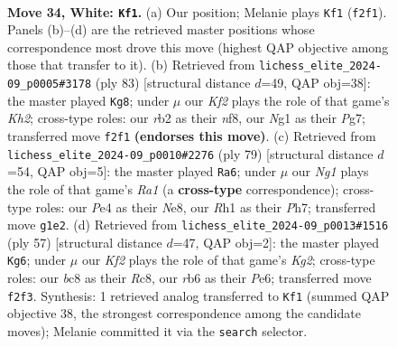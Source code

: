 \documentclass[11pt]{article}
\begin{document}
\begin{figure}[p]
\label{fig:thought-m64}
\end{figure}

\clearpage

\begin{figure}[p]\centering
\begin{subfigure}{0.46\textwidth}\centering
\resizebox{\linewidth}{!}{%
\newchessgame
\chessboard[
  setfen={2b4k/3n1p1p/1r4p1/3PP3/1p2P3/6P1/1r3K1P/R5NR w - - 1 34},
  showmover=false,
  pgfstyle=straightmove, color=movearrow, markmove={f2-f1}
]}
\caption{}
\end{subfigure}\hfill
\begin{subfigure}{0.46\textwidth}\centering
\resizebox{\linewidth}{!}{%
\newchessgame
\chessboard[
  setfen={5N2/6pk/p1n1Pp1p/8/3pR1PK/1r5P/2r5/4R3 b - - 3 42},
  showmover=false,
  pgfstyle=straightmove, color=movearrow, markmove={h7-g8}
]}
\caption{}
\end{subfigure}
\\[4pt]
\begin{subfigure}{0.46\textwidth}\centering
\resizebox{\linewidth}{!}{%
\newchessgame
\chessboard[
  setfen={r3nk2/5p1p/2Pp2p1/2p5/P1N3P1/1P2R2P/5P2/6K1 b - - 0 40},
  showmover=false,
  pgfstyle=straightmove, color=movearrow, markmove={a8-a6}
]}
\caption{}
\end{subfigure}\hfill
\begin{subfigure}{0.46\textwidth}\centering
\resizebox{\linewidth}{!}{%
\newchessgame
\chessboard[
  setfen={2r5/3p1pk1/3Ppn2/p1r3p1/8/P1N1R2P/1P4P1/3R2K1 b - - 3 29},
  showmover=false,
  pgfstyle=straightmove, color=movearrow, markmove={g7-g6}
]}
\caption{}
\end{subfigure}
\caption{\textbf{Move 34, White: \texttt{Kf1}.} (a) Our position; Melanie plays \texttt{Kf1} (\texttt{f2f1}). Panels (b)--(d) are the retrieved master positions whose correspondence most drove this move (highest QAP objective among those that transfer to it). (b) Retrieved from \texttt{lichess\_elite\_2024-09\_p0005\#3178} (ply 83) [structural distance $d$=49, QAP obj=38]: the master played \texttt{Kg8}; under $\mu$ our \emph{Kf2} plays the role of that game's \emph{Kh2}; cross-type roles: our \emph{r}b2 as their \emph{n}f8, our \emph{N}g1 as their \emph{P}g7; transferred move \texttt{f2f1} \textbf{(endorses this move)}. (c) Retrieved from \texttt{lichess\_elite\_2024-09\_p0010\#2276} (ply 79) [structural distance $d$=54, QAP obj=5]: the master played \texttt{Ra6}; under $\mu$ our \emph{Ng1} plays the role of that game's \emph{Ra1} (a \textbf{cross-type} correspondence); cross-type roles: our \emph{P}e4 as their \emph{N}e8, our \emph{R}h1 as their \emph{P}h7; transferred move \texttt{g1e2}. (d) Retrieved from \texttt{lichess\_elite\_2024-09\_p0013\#1516} (ply 57) [structural distance $d$=47, QAP obj=2]: the master played \texttt{Kg6}; under $\mu$ our \emph{Kf2} plays the role of that game's \emph{Kg2}; cross-type roles: our \emph{b}c8 as their \emph{R}c8, our \emph{r}b6 as their \emph{P}e6; transferred move \texttt{f2f3}. Synthesis: 1 retrieved analog transferred to \texttt{Kf1} (summed QAP objective 38, the strongest correspondence among the candidate moves); Melanie committed it via the \texttt{search} selector.}
\label{fig:thought-m66}
\end{figure}
\end{document}
